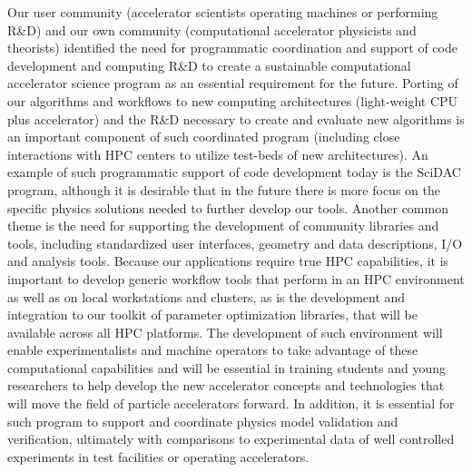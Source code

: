 Our user community (accelerator scientists operating machines or performing R\&D) and our own community (computational accelerator physicists and theorists) identified the need for programmatic coordination and support of code development and computing R\&D to create a sustainable
computational accelerator science program as an essential requirement for the future.   Porting of our
algorithms and workflows to new computing architectures
(light-weight CPU plus accelerator) and the R\&D necessary to
create and evaluate new algorithms is an important component of
such coordinated program (including close interactions with HPC
centers to utilize test-beds of new architectures). An example of
such programmatic support of code development today is the SciDAC program, although
it is desirable that in the future there is more focus on the
specific physics solutions needed to further develop our tools.  Another
common theme is the need for supporting the development of
community libraries and tools, including standardized user
interfaces, geometry and data descriptions, I/O and analysis tools.
Because our applications require true HPC capabilities,
it is important to develop generic workflow tools that perform in an HPC
environment as well as on local workstations and clusters, as is the development and
integration to our toolkit of parameter optimization libraries,
that will be available across all HPC platforms.  The development
of such environment will enable experimentalists and machine
operators to take advantage of these computational capabilities
and will be essential in training students and young researchers
to help develop the new accelerator concepts and technologies
that will move the field of particle accelerators forward.   In
addition, it is essential for such program to support and
coordinate physics model validation and verification, ultimately
with comparisons to experimental data of well controlled
experiments in test facilities or operating accelerators.

